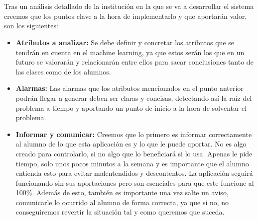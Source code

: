 \chapter{\actividadesClave}

\paragraph{}
Tras un análisis detallado de la institución en la que se va a desarrollar el sistema creemos que los puntos clave a la hora de implementarlo y que aportarán valor, son los siguientes:  
 
\begin{itemize}
\item \textbf{Atributos a analizar:} Se debe definir y concretar los atributos que se tendrán en cuenta en el machine learning, ya que estos serán los que en un futuro se valorarán y relacionarán entre ellos para sacar conclusiones tanto de las clases como de los alumnos.

\item \textbf{Alarmas:} Las alarmas que los atributos mencionados en el punto anterior podrán llegar a generar deben ser claras y concisas, detectando así la raíz del problema a tiempo y aportando un punto de inicio a la hora de solventar el problema.

\item \textbf{Informar y comunicar:} Creemos que lo primero es informar correctamente al alumno de lo que esta aplicación es y lo que le puede aportar. No es algo creado para controlarlo, si no algo que lo beneficiará si lo usa. Apenas le pide tiempo, solo unos pocos minutos a la semana y es importante que el alumno entienda esto para evitar malentendidos y descontentos. La aplicación seguirá funcionando sin sus aportaciones pero son esenciales para que este funcione al 100\%. Además de esto, también es importante una vez salte un aviso, comunicarle lo ocurrido al alumno de forma correcta, ya que si no, no conseguiremos revertir la situación tal y como queremos que suceda.

\nocite{marcoPedagogico}\nocite{hezkuntzaEreduArdatzak}\nocite{metodologiaParticipativa}\nocite{aprendizajeBasadoEnProblemas}\nocite{profesorUniversitario}\nocite{modeloUniversitario}
  
\end{itemize}






























